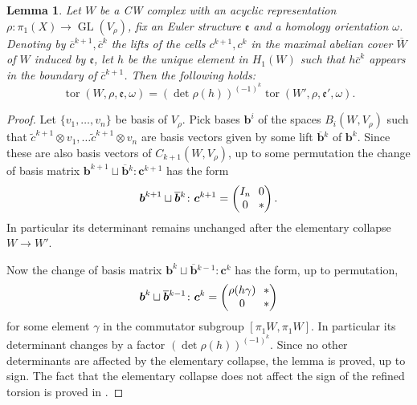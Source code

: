 \documentclass[JEP,XML,SOM,Unicode,NoFloatCountersInSection,published]{cedram}
\theoremstyle{plain}
\newtheorem{lem}[thm]{Lemma}
\theoremstyle{definition}
\theoremstyle{remark}
\DeclareMathOperator{\GL}{GL}
\numberwithin{equation}{section}
\DeclareMathOperator{\tor}{tor}
\begin{document}
\begin{lem}
\label{lem:torcollapse}
Let $W$ be a CW complex with an acyclic representation $\rho\colon \pi_1(X) \to \GL(V_\rho)$, fix an Euler structure $\mathfrak e$ and a homology orientation $\omega$. Denoting by $\overline c^{k+1}, \overline c^k$ the lifts of the cells $c^{k+1}, c^k$ in the maximal abelian cover $\overline W$ of $W$ induced by $\mathfrak e$, let $h$ be the unique element in $H_1(W)$ such that $h \overline c^k$ appears in the boundary of $\overline c^{k+1}$. Then the following holds:
\[
\tor(W, \rho, \mathfrak e, \omega) = (\det \rho(h))^{(-1)^k} \tor(W', \rho, \mathfrak e', \omega).
\]
\end{lem}
\begin{proof}
Let $\{v_1, \ldots, v_n\}$ be basis of $V_\rho$.
Pick bases $\boldsymbol{b}^i$ of the spaces $B_i(W,V_\rho)$ such that $\widetilde c^{k+1} \otimes v_1, \ldots \widetilde c^{k+1} \otimes v_n$ are basis vectors given by some lift $\boldsymbol{\overline b}{}^{k}$ of $\boldsymbol{b}^k$. Since these are also basis vectors of $C_{k+1}(W, V_\rho)$, up to some permutation the change of basis matrix $\boldsymbol{b}^{k+1} \sqcup \boldsymbol{\overline b}{}^{k} \colon \boldsymbol{c}^{k+1}$ has the form
\[\arraycolsep3.5pt
\boldsymbol{b}^{k+1} \sqcup \boldsymbol{\overline b}{}^{k} \colon \boldsymbol{c}^{k+1} = \begin{pmatrix} I_n & 0 \\ 0 & \ast \end{pmatrix}.
\]
In particular its determinant remains unchanged after the elementary collapse~\hbox{$W \!\!\to\! W'\!$}.

Now the change of basis matrix $\boldsymbol{b}^{k} \sqcup \boldsymbol{\overline b}{}^{k-1} \colon \boldsymbol{c}^{k}$ has the form, up to permutation,
\[\arraycolsep3.5pt
\boldsymbol{b}^{k} \sqcup \boldsymbol{\overline b}{}^{k-1} \colon \boldsymbol{c}^{k} = \begin{pmatrix} \rho(h \gamma) & \ast \\ 0 & \ast \end{pmatrix}
\]
for some element $\gamma$ in the commutator subgroup $[\pi_1 W, \pi_1 W]$. In particular its determinant changes by a factor $(\det \rho(h))^{(-1)^k}$. Since no other determinants are affected by the elementary collapse, the lemma is proved, up to sign.
The fact that the elementary collapse does not affect the sign of the refined torsion is proved in \cite[Lem.\,18.4]{Turaev_book}.
\end{proof}
\end{document}
